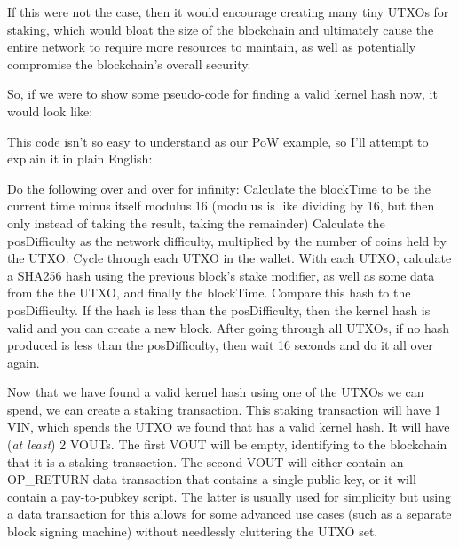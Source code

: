 If this were not the case, then it would encourage creating many tiny UTXOs
for staking, which would bloat the size of the blockchain and ultimately
cause the entire network to require more resources to maintain, as well as
potentially compromise the blockchain's overall security.



So, if we were to show some pseudo-code for finding a valid kernel hash now,
it would look like:



\vspace{5mm} %



\vspace{5mm} %



This code isn't so easy to understand as our PoW example, so I'll attempt to
explain it in plain English:



Do the following over and over for infinity:
Calculate the blockTime to be the current time minus itself modulus 16
(modulus is like dividing by 16, but then only instead of taking the
result, taking the remainder)
Calculate the posDifficulty as the network difficulty, multiplied by the
number of coins held by the UTXO.
Cycle through each UTXO in the wallet. With each UTXO, calculate a SHA256
hash using the previous block's stake modifier, as well as some data from
the the UTXO, and finally the blockTime. Compare this hash to the
posDifficulty. If the hash is less than the posDifficulty, then the kernel
hash is valid and you can create a new block.
After going through all UTXOs, if no hash produced is less than the
posDifficulty, then wait 16 seconds and do it all over again.



Now that we have found a valid kernel hash using one of the UTXOs we can
spend, we can create a staking transaction. This staking transaction will
have 1 VIN, which spends the UTXO we found that has a valid kernel hash.
It will have (\textit{at least}) 2 VOUTs. The first VOUT will be empty,
identifying to the blockchain that it is a staking transaction. The second
VOUT will either contain an OP\_RETURN data transaction that contains a single
public key, or it will contain a pay-to-pubkey script. The latter is usually
used for simplicity but using a data transaction for this allows for some
advanced use cases (such as a separate block signing machine) without
needlessly cluttering the UTXO set.



